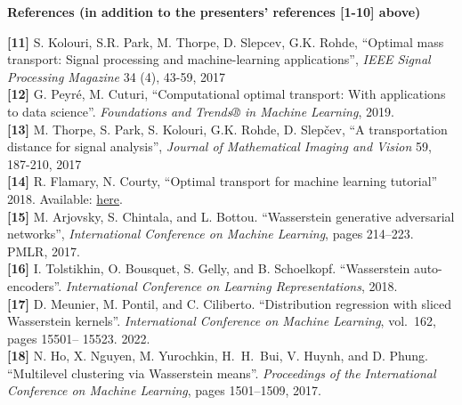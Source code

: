 \documentclass{article}
\renewenvironment{thebibliography}[1]{%
  \subsection*{\refname}%
  \let\par\relax\let\newblock\relax%
  \inparaenum[{[}1{]}]}{\endinparaenum}
\begin{document}
\medskip
\medskip
\noindent\textbf{References (in addition to the presenters’ references [1-10] above)
}
\medskip
\medskip

\noindent\textbf{[11]} S. Kolouri, S.R. Park, M. Thorpe, D. Slepcev, G.K. Rohde, “Optimal mass transport: Signal processing and machine-learning applications”, \emph{IEEE Signal Processing Magazine} 34 (4), 43-59, 2017\\
\textbf{[12]} G. Peyré, M. Cuturi, “Computational optimal transport: With applications to data science”. \emph{Foundations and Trends® in Machine Learning}, 2019.\\
\textbf{[13]} M. Thorpe, S. Park, S. Kolouri, G.K. Rohde, D. Slepčev, “A transportation distance for signal analysis”, \emph{Journal of Mathematical Imaging and Vision} 59, 187-210, 2017\\
\textbf{[14]} R. Flamary, N. Courty, “Optimal transport for machine learning tutorial” 2018. Available: \href{https://remi.flamary.com/cours/tuto_otml.html}{here}.\\
\textbf{[15]} M. Arjovsky, S. Chintala, and L. Bottou. “Wasserstein generative adversarial networks”, \emph{International Conference on Machine Learning}, pages 214–223. PMLR, 2017.\\
\textbf{[16]} I. Tolstikhin, O. Bousquet, S. Gelly, and B. Schoelkopf. “Wasserstein auto-encoders”. \emph{International Conference on Learning Representations}, 2018.\\
\textbf{[17]} D. Meunier, M. Pontil, and C. Ciliberto. “Distribution regression with sliced Wasserstein kernels”. \emph{International Conference on Machine Learning}, vol.~162, pages 15501– 15523. 2022.\\
\textbf{[18]} N. Ho, X. Nguyen, M. Yurochkin, H.~H.~Bui, V. Huynh, and D. Phung. “Multilevel clustering via Wasserstein means”. \emph{Proceedings of the International Conference on Machine Learning}, pages 1501–1509, 2017.




\iffalse
\small
\begin{spacing}{1.1}
\begin{thebibliography}{author-year }
\bibitem{ref1} Reference 1.
\bibitem{ref2} Reference 2.
\end{thebibliography}
\end{spacing}
\fi
\end{document}
